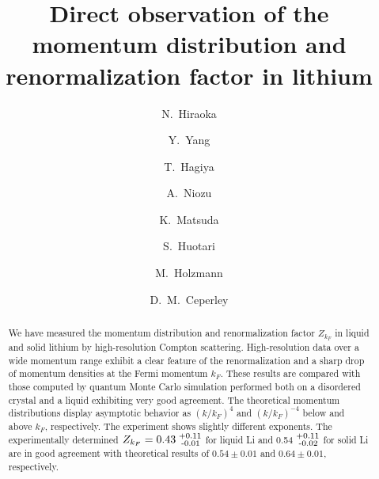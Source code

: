 \documentclass[twocolumn,showpacs,showkeys,fleqn,prl,superscriptaddress]{revtex4}%
\newcommand{\nn}[1]{\textnormal{ #1}}
\begin{document}

\title{
Direct observation of the momentum distribution and renormalization factor in lithium
}

\author{ 
N.~Hiraoka
}

\author{ 
Y.~Yang
}

\author{ 
T.~Hagiya
}
  
\author{ 
A.~Niozu
}

\author{ 
K.~Matsuda
}

\author{ 
S.~Huotari
}


\author{ 
M.~Holzmann
}

\author{ 
D.~M.~Ceperley
}


\date{}
\begin{abstract}

We have measured the momentum distribution and renormalization factor $Z_{k_F}$ in liquid and solid lithium by high-resolution Compton scattering.
High-resolution data over a wide momentum range exhibit a clear feature of the renormalization and a sharp drop of momentum densities at the Fermi momentum $k_F$.
These results are compared with those computed by quantum Monte Carlo simulation performed both on a disordered crystal and a liquid exhibiting very good agreement.
The theoretical momentum distributions display asymptotic behavior as $(k/k_F)^4$ and $(k/k_F)^{-4}$ below and above $k_F$, respectively.
The experiment shows slightly different exponents.
The experimentally determined $Z_{k_F}=  0.43^{\nn{+0.11}}_{\nn{\;-0.01}}$ for liquid Li and 0.54$^{\nn{+0.11}}_{\nn{\;-0.02}}$ for solid Li are in good agreement with theoretical results of $0.54\pm0.01$ and $0.64\pm0.01$, respectively.
\end{abstract}
\maketitle
\end{document}
